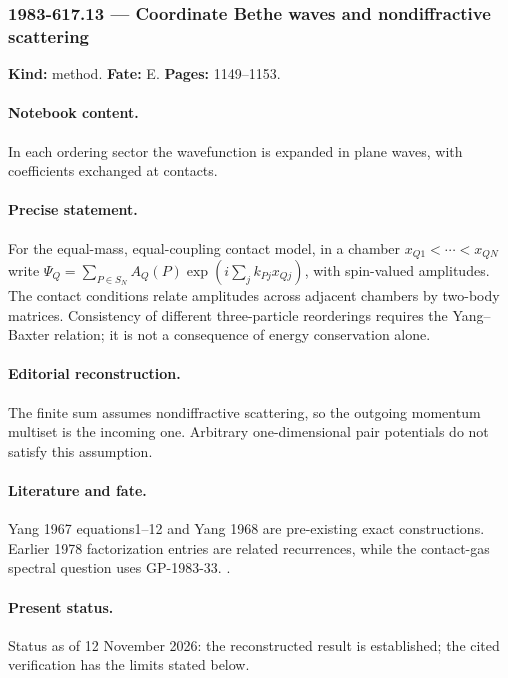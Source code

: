 \subsubsection{1983-617.13 --- Coordinate Bethe waves and nondiffractive scattering}

\label{item:1983-617.13}

\noindent\textbf{Kind:} method. \textbf{Fate:} E. \textbf{Pages:} 1149--1153.\par

\paragraph{Notebook content.} In each ordering sector the wavefunction is expanded in plane waves, with coefficients exchanged at contacts.

\paragraph{Precise statement.} For the equal-mass, equal-coupling contact model, in a chamber $x_{Q1}<\cdots<x_{QN}$ write $\Psi_Q=\sum_{P\in S_N}A_Q(P)\exp(i\sum_jk_{Pj}x_{Qj})$, with spin-valued amplitudes. The contact conditions relate amplitudes across adjacent chambers by two-body matrices. Consistency of different three-particle reorderings requires the Yang--Baxter relation; it is not a consequence of energy conservation alone.

\paragraph{Editorial reconstruction.} The finite sum assumes nondiffractive scattering, so the outgoing momentum multiset is the incoming one. Arbitrary one-dimensional pair potentials do not satisfy this assumption.

\paragraph{Literature and fate.} Yang 1967 equations1--12 and Yang 1968 are pre-existing exact constructions. Earlier 1978 factorization entries are related recurrences, while the contact-gas spectral question uses GP-1983-33. \citep{yang1967manybody,yang1968smatrix}.

\paragraph{Present status.} Status as of 12 November 2026: the reconstructed result is established; the cited verification has the limits stated below.

